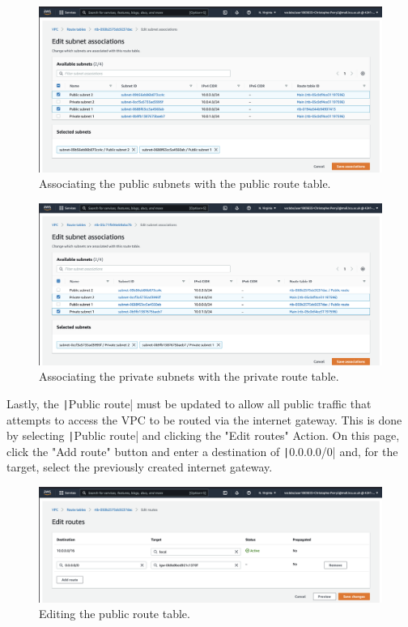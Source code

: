 \begin{figure}[!htbp]
    \centering
    \includegraphics[width=\textwidth]{resources/vpc/routes/vpc-subnet-public-ass}
    \caption{Associating the public subnets with the public route table.}
    \label{fig:vpc-public-ass}
\end{figure}

\begin{figure}[!htbp]
    \centering
    \includegraphics[width=\textwidth]{resources/vpc/routes/vpc-subnet-private-ass}
    \caption{Associating the private subnets with the private route table.}
    \label{fig:vpc-private-ass}
\end{figure}

Lastly, the \texttt|Public route| must be updated to allow all public traffic that attempts to access the VPC
to be routed via the internet gateway.
This is done by selecting \texttt|Public route| and clicking the "Edit routes" Action.
On this page, click the "Add route" button and enter a destination of \texttt|0.0.0.0/0| and, for the target,
select the previously created internet gateway.

\begin{figure}[!htbp]
    \centering
    \includegraphics[width=\textwidth]{resources/vpc/routes/vpc-public-route-table}
    \caption{Editing the public route table.}
    \label{fig:vpc-public-route-table}
\end{figure}

